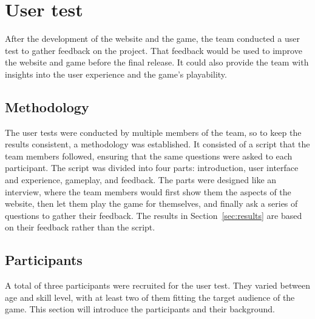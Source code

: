 \chapter{User test}\label{ch:user-test}

After the development of the website and the game, the team conducted a user test to gather feedback on the project.
That feedback would be used to improve the website and game before the final release.
It could also provide the team with insights into the user experience and the game's playability.

\section{Methodology}\label{sec:methodology}

The user tests were conducted by multiple members of the team, so to keep the results consistent, a methodology was
established.
It consisted of a script that the team members followed, ensuring that the same questions were asked to each
participant.
The script was divided into four parts: introduction, user interface and experience, gameplay, and feedback.
The parts were designed like an interview, where the team members would first show them the aspects of the website,
then let them play the game for themselves, and finally ask a series of questions to gather their feedback.
The results in Section~\ref{sec:results} are based on their feedback rather than the script.

\section{Participants}\label{sec:participants}

A total of three participants were recruited for the user test.
They varied between age and skill level, with at least two of them fitting the target audience of the game.
This section will introduce the participants and their background.

